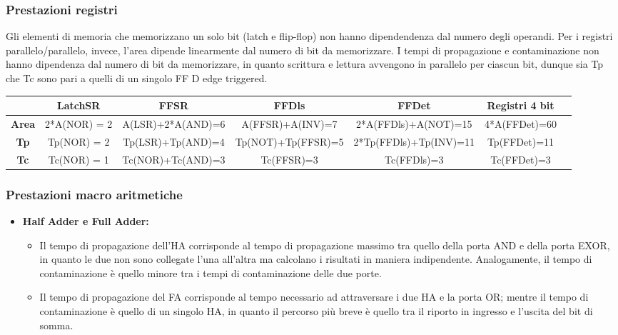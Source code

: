 \documentclass[10pt]{article}
\begin{document}
\begin{itemize}
\subsubsection{Prestazioni registri}
Gli elementi di memoria che memorizzano un solo bit (latch e flip-flop) non hanno dipendendenza dal numero degli operandi.
Per i registri parallelo/parallelo, invece, l'area dipende linearmente dal numero di bit da memorizzare.
I tempi di propagazione e contaminazione non hanno dipendenza dal numero di bit da memorizzare, in quanto scrittura e lettura avvengono in parallelo per ciascun bit, dunque sia Tp che Tc sono pari
a quelli di un singolo FF D edge triggered.

\begin{table}[H]
    \begin{minipage}[c]{\textwidth}
    \centering
        \begin{tabular}{|c|c|c|c|c|c|c|}
        \hline
                      & \textbf{LatchSR}  & \textbf{FFSR}      & \textbf{FFDls}     & \textbf{FFDet}         & \textbf{Registri 4 bit} \\ \hline
        \textbf{Area} & 2*A(NOR) = 2      & A(LSR)+2*A(AND)=6  & A(FFSR)+A(INV)=7   & 2*A(FFDls)+A(NOT)=15   & 4*A(FFDet)=60           \\ 
        \textbf{Tp}   & Tp(NOR) = 2       & Tp(LSR)+Tp(AND)=4  & Tp(NOT)+Tp(FFSR)=5 & 2*Tp(FFDls)+Tp(INV)=11 & Tp(FFDet)=11            \\ 
        \textbf{Tc}   & Tc(NOR) = 1       & Tc(NOR)+Tc(AND)=3  & Tc(FFSR)=3         & Tc(FFDls)=3            & Tc(FFDet)=3             \\ \hline
        \end{tabular}
    \end{minipage}
\end{table}

\subsubsection{Prestazioni macro aritmetiche}
\begin{itemize}
\item \textbf{Half Adder e Full Adder:}
    \begin{itemize}
        \item Il tempo di propagazione dell'HA corrisponde al tempo di propagazione massimo tra quello della porta AND e della porta EXOR, in quanto le due non sono collegate l'una all'altra
        ma calcolano i risultati in maniera indipendente. Analogamente, il tempo di contaminazione è quello minore tra i tempi di contaminazione delle due porte.
        \item Il tempo di propagazione del FA corrisponde al tempo necessario ad attraversare i due HA e la porta OR; mentre il tempo di contaminazione è quello di un singolo HA, in quanto il percorso 
        più breve è quello tra il riporto in ingresso e l'uscita del bit di somma.
    \end{itemize}
    

\end{itemize}
\end{itemize}
\end{document}
